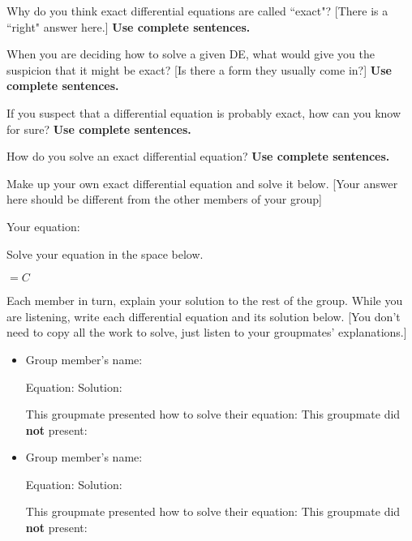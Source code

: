 \documentclass[12pt]{article}
\begin{document}
\begin{enumerate}
  \setcounter{problemnumber}{1}
	\Problem Why do you think exact differential equations are called ``exact"? {\small [There is a ``right" answer here.]} \textbf{Use complete sentences.}
	
	\vfill

  \Problem When you are deciding how to solve a given DE, what would give you the suspicion that it might be exact? {\small [Is there a form they usually come in?] }  \textbf{Use complete sentences.}
  
  \vfill
  
  \Problem If you suspect that a differential equation is probably exact, how can you know for sure?  \textbf{Use complete sentences.}
  
  \vfill
  
  \Problem How do you solve an exact differential equation?  \textbf{Use complete sentences.}
  
  \vfill
  
  \pagebreak
  \Problem Make up your own exact differential equation and solve it below. {\small [Your answer here should be different from the other members of your group] } 

	Your equation:   
	
	Solve your equation in the space below. 
	\begin{flushright}
	 $= C$
	\end{flushright}
  \vfill
  \vfill
  \vfill
  \vfill
  
  \Problem Each member in turn, explain your solution to the rest of the  group. While you are listening, write each differential equation and its solution below. {\small [You don't need to copy all the work to solve, just listen to your groupmates' explanations.] } 
   	\begin{itemize}
   	\item Group member's name: 
   	
   		Equation:  \hfill Solution: 
   	
			This groupmate presented how to solve their equation: \checkbox
			\hfill This groupmate did \textbf{not} present: \checkbox
   		\bigskip
   	
   	\item Group member's name: 
   	
   		Equation:  \hfill Solution: 
   	
			This groupmate presented how to solve their equation: \checkbox
			\hfill This groupmate did \textbf{not} present: \checkbox
   		\bigskip
   	   	
   	\end{itemize}
  
	
\end{enumerate}
\end{document}
